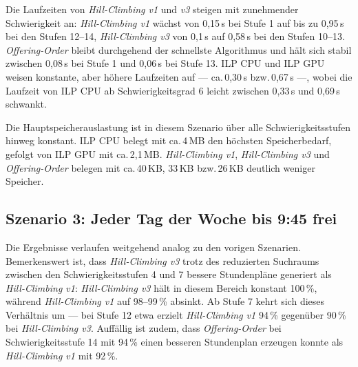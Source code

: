 Die Laufzeiten von \textit{Hill-Climbing v1} und \textit{v3} steigen mit zunehmender
Schwierigkeit an: \textit{Hill-Climbing v1} wächst von 0{,}15\,s bei Stufe 1 auf bis zu
0{,}95\,s bei den Stufen 12--14, \textit{Hill-Climbing v3} von 0{,}1\,s auf 0{,}58\,s bei
den Stufen 10--13. \textit{Offering-Order} bleibt durchgehend der schnellste Algorithmus und
hält sich stabil zwischen 0{,}08\,s bei Stufe 1 und 0{,}06\,s bei Stufe 13. ILP CPU und ILP
GPU weisen konstante, aber höhere Laufzeiten auf --- ca.\,0{,}30\,s bzw.\,0{,}67\,s ---, wobei
die Laufzeit von ILP CPU ab Schwierigkeitsgrad 6 leicht zwischen 0{,}33\,s und 0{,}69\,s
schwankt.

\vspace{1cm}

\newpage

Die Hauptspeicherauslastung ist in diesem Szenario über alle Schwierigkeitsstufen hinweg
konstant. ILP CPU belegt mit ca.\,4\,MB den höchsten Speicherbedarf, gefolgt von ILP GPU mit
ca.\,2{,}1\,MB. \textit{Hill-Climbing v1}, \textit{Hill-Climbing v3} und
\textit{Offering-Order} belegen mit ca.\,40\,KB, 33\,KB bzw.\,26\,KB deutlich weniger
Speicher.

\vspace{1cm}

\newpage


\subsection{Szenario 3: Jeder Tag der Woche bis 9:45 frei}

Die Ergebnisse verlaufen weitgehend analog zu den vorigen Szenarien. Bemerkenswert ist, dass
\textit{Hill-Climbing v3} trotz des reduzierten Suchraums zwischen den Schwierigkeitsstufen 4
und 7 bessere Stundenpläne generiert als \textit{Hill-Climbing v1}: \textit{Hill-Climbing v3}
hält in diesem Bereich konstant 100\,\%, während \textit{Hill-Climbing v1} auf 98--99\,\%
absinkt. Ab Stufe 7 kehrt sich dieses Verhältnis um --- bei Stufe 12 etwa erzielt
\textit{Hill-Climbing v1} 94\,\% gegenüber 90\,\% bei \textit{Hill-Climbing v3}. Auffällig
ist zudem, dass \textit{Offering-Order} bei Schwierigkeitsstufe 14 mit 94\,\% einen besseren
Stundenplan erzeugen konnte als \textit{Hill-Climbing v1} mit 92\,\%.


